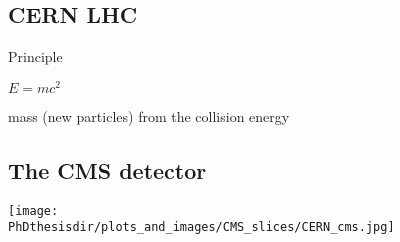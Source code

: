 \subsection*{CERN LHC}
\begin{frame}{Principle}

\begin{center}
{\LARGE $E = mc^2$}

\vfill

mass (new particles) from the collision energy
\end{center}

\end{frame}

%


\subsection*{The CMS detector}


%
%


\begin{frame}
\vspace{-2.3pt}
\begin{center}
\texttt{[image: \\PhDthesisdir/plots\_and\_images/CMS\_slices/CERN\_cms.jpg]}
\end{center}
\vspace{-7pt}
\end{frame}



